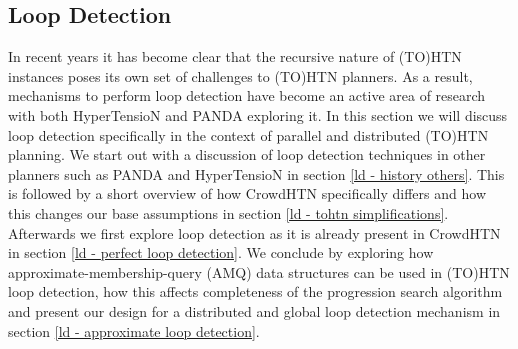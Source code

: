 
\subsection{Loop Detection}
\label{improv: loop detection}
In recent years it has become clear that the recursive nature of (TO)HTN instances poses its own set of challenges to (TO)HTN planners. As a result, mechanisms to perform loop detection have become an active area of research with both HyperTensioN \cite{magnaguagno2020hypertension} and PANDA \cite{holler2021loop} exploring it.
In this section we will discuss loop detection specifically in the context of parallel and distributed (TO)HTN planning. We start out with a discussion of loop detection techniques in other planners such as PANDA and HyperTensioN in section \ref{ld - history others}. This is followed by a short overview of how CrowdHTN specifically differs and how this changes our base assumptions in section \ref{ld - tohtn simplifications}. Afterwards we first explore loop detection as it is already present in CrowdHTN in section \ref{ld - perfect loop detection}. We conclude by exploring how approximate-membership-query (AMQ) data structures can be used in (TO)HTN loop detection, how this affects completeness of the progression search algorithm and present our design for a distributed and global loop detection mechanism in section \ref{ld - approximate loop detection}.

\begin{comment}
- loop detection in other planners
- changes in CrowdHTN as a parallel planner
- loop detection based on hash sets
- what happens if we allow false positives
- implications on completeness (and how we deal with it)
- designing a distributed loop detection mechanism with information sharing

\todo{Make sure to always talk about isomorphic task networks instead of equivalent? Quote \cite{holler2021loop}. Define isomorphism!}
\todo{quote about loop detection in graph search?}
\todo{quote about distributed loop detection in graph search?}
This section will discuss loop detection as it is used in (TO)HTN planning in general. It will start with an overview over loop detection in other HTN planners in section \ref{ld - history others}. This is followed by a discussion of the simplifying assumptions we can make for TOHTN planning in section \ref{ld - tohtn simplifications}.
- distributed loop detection (communication and merge operations become important!)
- perfect loop detection
- probabilistic loop detection (approximate membership query)
\end{comment}

